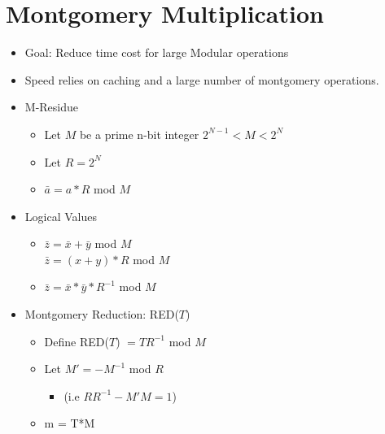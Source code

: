 \section{Montgomery Multiplication}
\begin{itemize}
\item Goal: Reduce time cost for large Modular operations
\item Speed relies on caching and a large number of montgomery operations.
\item M-Residue
    \begin{itemize}
    \item Let $M$ be a prime n-bit integer $2^{N-1} < M < 2^N$
    \item Let $R = 2^N$
    \item $\bar{a} = a*R$ mod $M$
    \end{itemize}
\item Logical Values
    \begin{itemize}
    \item $\bar{z} = \bar{x} + \bar{y}$ mod $M$
        \\$\bar{z} = (x+y)*R$ mod $M$
    \item $\bar{z} = \bar{x}*\bar{y}*R^{-1}$ mod $M$
    \end{itemize}
\item Montgomery Reduction: RED($T$)
    \begin{itemize}
    \item Define RED($T$) $= TR^{-1}$ mod $M$
    \item Let $M' = -M^{-1}$ mod $R$
        \begin{itemize}
        \item (i.e $RR^{-1} - M'M = 1$)
        \end{itemize}
    \item m = T*M
    \end{itemize}
\end{itemize}